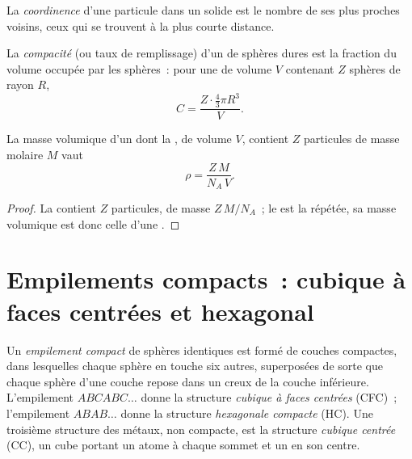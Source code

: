 \begin{definition}[Coordinence]\label{def:b1:crystals-metals:coordination}
La \emph{coordinence} d'une particule dans un solide
est le nombre de ses plus proches voisins, ceux qui se trouvent à la
plus courte distance.
\end{definition}

\begin{definition}[Compacité]\label{def:b1:crystals-metals:compactness}
La \emph{compacité} (ou taux de remplissage) d'un
 de sphères dures est la fraction du volume occupée par les
sphères~: pour une  de volume $V$ contenant $Z$ sphères de rayon
$R$,
\[
  C = \frac{Z \cdot \frac43 \pi R^3}{V} .
\]
\end{definition}

\begin{proposition}\label{prop:b1:crystals-metals:density}
La masse volumique d'un  dont la , de volume $V$, contient
$Z$ particules de masse molaire $M$ vaut
\[
  \rho = \frac{Z\,M}{N_A\,V} .
\]
\end{proposition}

\begin{proof}
La  contient $Z$ particules, de masse $Z\,M/N_A$~; le  est
la  répétée, sa masse volumique est donc celle d'une .
\end{proof}

\section{Empilements compacts~: cubique à faces centrées et hexagonal}

\begin{definition}\label{def:b1:crystals-metals:packings}
Un \emph{empilement compact} de sphères identiques est formé de
couches compactes, dans lesquelles chaque sphère en touche six autres,
superposées de sorte que chaque sphère d'une couche repose dans un creux
de la couche inférieure. L'empilement $ABCABC\dots$ donne la structure
\emph{cubique à faces centrées} (CFC)~; l'empilement $ABAB\dots$
donne la structure \emph{hexagonale compacte}
(HC). Une troisième structure des métaux, non compacte, est la structure
\emph{cubique centrée} (CC), un cube portant un atome à
chaque sommet et un en son centre.
\end{definition}


